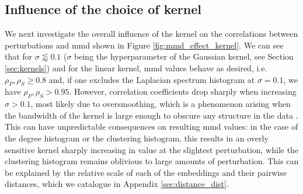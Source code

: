 \subsection{Influence of the choice of kernel}

We next investigate the overall influence of the kernel on the correlations
between perturbations and \gls{mmd} shown in Figure
\ref{fig:mmd_effect_kernel}. We can see that for $\sigma\lessapprox 0.1$
($\sigma$ being the hyperparameter of the Gaussian kernel, see Section
\ref{sec:kernels}) and for the linear kernel, \gls{mmd} values behave as
desired, i.e. $\rho_P, \rho_S\geq 0.8$ and, if one excludes the Laplacian
spectrum histogram at $\sigma=0.1$, we have $\rho_P,\rho_S>0.95$. However,
correlation coefficients drop sharply when increasing $\sigma>0.1$, most likely
due to oversmoothing, which is a phenomenon arising when the bandwidth of the
kernel is large enough to obscure any structure in the data
\citep{hwang1994nonparametric}. This can have unpredictable consequences on
resulting \gls{mmd} values: in the case of the degree histogram or the clustering
histogram, this results in an overly sensitive kernel sharply increasing in
value at the slightest perturbation, while the clustering histogram remains
oblivious to large amounts of perturbation. This can be explained by the
relative scale of each of the embeddings and their pairwise distances, which we
catalogue in Appendix \ref{sec:distance_dist}.

